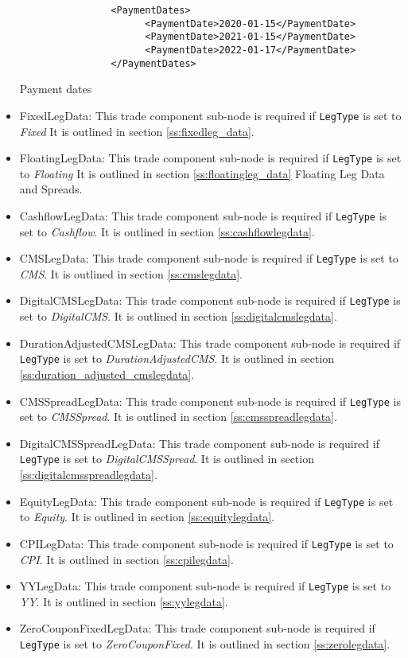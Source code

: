 \begin{itemize}
\begin{listing}[H]
\begin{verbatim}
                <PaymentDates>
                      <PaymentDate>2020-01-15</PaymentDate>
                      <PaymentDate>2021-01-15</PaymentDate>
                      <PaymentDate>2022-01-17</PaymentDate>
                </PaymentDates>
\end{verbatim}
\caption{Payment dates}
\label{lst:paymentdates}
\end{listing}

\item FixedLegData: This trade component sub-node is required if \lstinline!LegType! is set to \emph{Fixed} It is
outlined in section \ref{ss:fixedleg_data}.
\item FloatingLegData: This trade component sub-node is required if \lstinline!LegType! is set to \emph{Floating} It is
outlined in section \ref{ss:floatingleg_data} Floating Leg Data and Spreads.
\item CashflowLegData: This trade component sub-node is required if \lstinline!LegType! is set to \emph{Cashflow}. It is
  outlined in section \ref{ss:cashflowlegdata}.
\item CMSLegData: This trade component sub-node is required if \lstinline!LegType! is set to \emph{CMS}. It is
  outlined in section \ref{ss:cmslegdata}.
\item DigitalCMSLegData: This trade component sub-node is required if \lstinline!LegType! is set to \emph{DigitalCMS}. It is
  outlined in section \ref{ss:digitalcmslegdata}.
\item DurationAdjustedCMSLegData: This trade component sub-node is required if \lstinline!LegType! is set to \emph{DurationAdjustedCMS}. It is
  outlined in section \ref{ss:duration_adjusted_cmslegdata}.  
\item CMSSpreadLegData: This trade component sub-node is required if \lstinline!LegType! is set to \emph{CMSSpread}. It is
  outlined in section \ref{ss:cmsspreadlegdata}.
\item DigitalCMSSpreadLegData: This trade component sub-node is required if \lstinline!LegType! is set to \emph{DigitalCMSSpread}. It is
  outlined in section \ref{ss:digitalcmsspreadlegdata}.
\item EquityLegData: This trade component sub-node is required if \lstinline!LegType! is set to \emph{Equity}. It is
  outlined in section \ref{ss:equitylegdata}.    
\item CPILegData: This trade component sub-node is required if \lstinline!LegType! is set to \emph{CPI}. It is
  outlined in section \ref{ss:cpilegdata}.
\item YYLegData: This trade component sub-node is required if \lstinline!LegType! is set to \emph{YY}. It is
  outlined in section \ref{ss:yylegdata}.
\item ZeroCouponFixedLegData: This trade component sub-node is required if \lstinline!LegType! is set to \emph{ZeroCouponFixed}. It is
  outlined in section \ref{ss:zerolegdata}.
\end{itemize}
